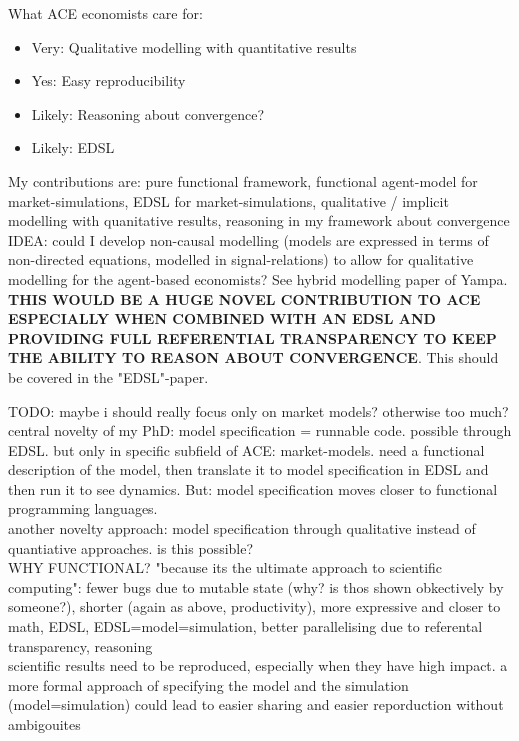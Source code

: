 What ACE economists care for:

\begin{itemize}
\item Very: Qualitative modelling with quantitative results
\item Yes: Easy reproducibility
\item Likely: Reasoning about convergence?
\item Likely: EDSL
\end{itemize}

My contributions are: pure functional framework, functional agent-model for market-simulations, EDSL for market-simulations, qualitative / implicit modelling with quanitative results, reasoning in my framework about convergence \\

IDEA: could I develop non-causal modelling (models are expressed in terms of non-directed equations, modelled in signal-relations) to allow for qualitative modelling for the agent-based economists? See hybrid modelling paper of Yampa. \textbf{THIS WOULD BE A HUGE NOVEL CONTRIBUTION TO ACE ESPECIALLY WHEN COMBINED WITH AN EDSL AND PROVIDING FULL REFERENTIAL TRANSPARENCY TO KEEP THE ABILITY TO REASON ABOUT CONVERGENCE}. This should be covered in the "EDSL"-paper.

TODO: maybe i should really focus only on market models? otherwise too much? \\

central novelty of my PhD: model specification = runnable code. possible through EDSL. but only in specific subfield of ACE: market-models. need a functional description of the model, then translate it to model specification in EDSL and then run it to see dynamics. But: model specification moves closer to functional programming languages. \\

another novelty approach: model specification through qualitative instead of quantiative approaches. is this possible? \\

WHY FUNCTIONAL? "because its the ultimate approach to scientific computing": fewer bugs due to mutable state (why? is thos shown obkectively by someone?), shorter (again as above, productivity), more expressive and closer to math, EDSL, EDSL=model=simulation, better parallelising due to referental transparency, reasoning \\

scientific results need to be reproduced, especially when they have high impact. a more formal approach of specifying the model and the simulation (model=simulation) could lead to easier sharing and easier reporduction without ambigouites \\

